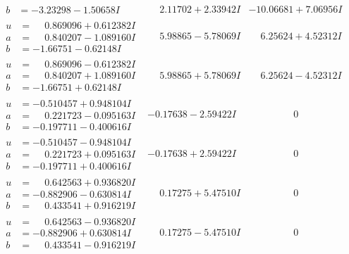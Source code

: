 \documentclass[1p]{elsarticle_modified}
\theoremstyle{definition}
\begin{document}
$$\begin{array}{c|c|c}
\begin{aligned}
b &= -3.23298 - 1.50658 I\end{aligned}
 & \phantom{-}2.11702 + 2.33942 I & -10.06681 + 7.06956 I \\ \hline\begin{aligned}
u &= \phantom{-}0.869096 + 0.612382 I \\
a &= \phantom{-}0.840207 - 1.089160 I \\
b &= -1.66751 - 0.62148 I\end{aligned}
 & \phantom{-}5.98865 - 5.78069 I & \phantom{-}6.25624 + 4.52312 I \\ \hline\begin{aligned}
u &= \phantom{-}0.869096 - 0.612382 I \\
a &= \phantom{-}0.840207 + 1.089160 I \\
b &= -1.66751 + 0.62148 I\end{aligned}
 & \phantom{-}5.98865 + 5.78069 I & \phantom{-}6.25624 - 4.52312 I \\ \hline\begin{aligned}
u &= -0.510457 + 0.948104 I \\
a &= \phantom{-}0.221723 - 0.095163 I \\
b &= -0.197711 - 0.400616 I\end{aligned}
 & -0.17638 - 2.59422 I & \phantom{-0.000000 } 0 \\ \hline\begin{aligned}
u &= -0.510457 - 0.948104 I \\
a &= \phantom{-}0.221723 + 0.095163 I \\
b &= -0.197711 + 0.400616 I\end{aligned}
 & -0.17638 + 2.59422 I & \phantom{-0.000000 } 0 \\ \hline\begin{aligned}
u &= \phantom{-}0.642563 + 0.936820 I \\
a &= -0.882906 - 0.630814 I \\
b &= \phantom{-}0.433541 + 0.916219 I\end{aligned}
 & \phantom{-}0.17275 + 5.47510 I & \phantom{-0.000000 } 0 \\ \hline\begin{aligned}
u &= \phantom{-}0.642563 - 0.936820 I \\
a &= -0.882906 + 0.630814 I \\
b &= \phantom{-}0.433541 - 0.916219 I\end{aligned}
 & \phantom{-}0.17275 - 5.47510 I & \phantom{-0.000000 } 0 \\ \hline\begin{aligned}

\end{aligned}
\end{array}$$
\end{document}
